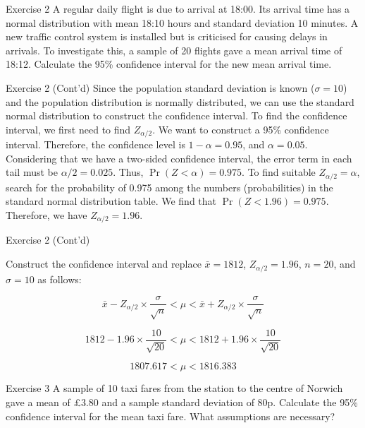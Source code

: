 \documentclass[
  ignorenonframetext,
  aspectratio=43,
]{beamer}
\begin{document}
\begin{frame}{Exercise 2}
\protect\hypertarget{exercise-2}{}
A regular daily flight is due to arrival at 18:00. Its arrival time has
a normal distribution with mean 18:10 hours and standard deviation 10
minutes. A new traffic control system is installed but is criticised for
causing delays in arrivals. To investigate this, a sample of 20 flights
gave a mean arrival time of 18:12. Calculate the 95\% confidence
interval for the new mean arrival time.
\end{frame}

\begin{frame}{Exercise 2 (Cont'd)}
\protect\hypertarget{exercise-2-contd}{}
Since the population standard deviation is known (\(\sigma = 10\)) and
the population distribution is normally distributed, we can use the
standard normal distribution to construct the confidence interval. To
find the confidence interval, we first need to find \(Z_{\alpha/2}\). We
want to construct a 95\% confidence interval. Therefore, the confidence
level is \(1-\alpha = 0.95\), and \(\alpha = 0.05\). Considering that we
have a two-sided confidence interval, the error term in each tail must
be \(\alpha/2 = 0.025\). Thus, \(\Pr(Z < \alpha) = 0.975\). To find
suitable \(Z_{\alpha/2} = \alpha\), search for the probability of 0.975
among the numbers (probabilities) in the standard normal distribution
table. We find that \(\Pr(Z < 1.96) = 0.975\). Therefore, we have
\(Z_{\alpha/2} = 1.96.\)
\end{frame}

\begin{frame}{Exercise 2 (Cont'd)}
\protect\hypertarget{exercise-2-contd-1}{}
\pause

Construct the confidence interval and replace \(\bar{x} = 1812\),
\(Z_{\alpha/2} = 1.96\), \(n = 20\), and \(\sigma = 10\) as follows:

\pause

\[
\bar{x} - Z_{\alpha/2} \times \frac{\sigma}{\sqrt{n}} < \mu < \bar{x} + Z_{\alpha/2} \times \frac{\sigma}{\sqrt{n}}
\]

\pause

\[
1812 - 1.96 \times \frac{10}{\sqrt{20}} < \mu < 1812 + 1.96 \times \frac{10}{\sqrt{20}}
\]

\pause

\[
1807.617 < \mu < 1816.383
\]
\end{frame}

\begin{frame}{Exercise 3}
\protect\hypertarget{exercise-3}{}
A sample of 10 taxi fares from the station to the centre of Norwich gave
a mean of £3.80 and a sample standard deviation of 80p. Calculate the
95\% confidence interval for the mean taxi fare. What assumptions are
necessary?
\end{frame}
\end{document}
